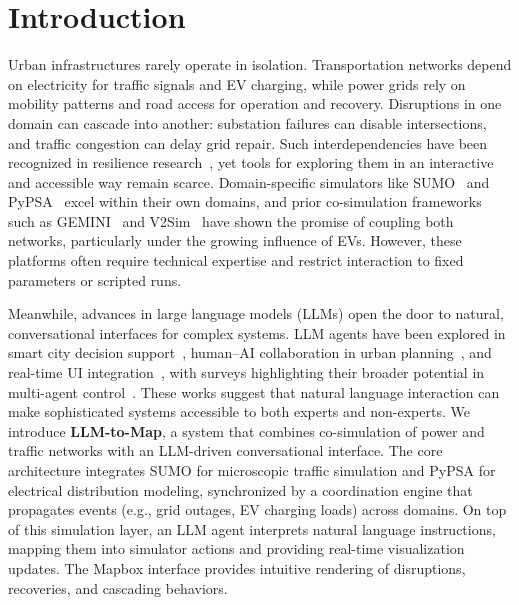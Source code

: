 \documentclass[sigconf,review,nonacm]{acmart}
\begin{document}
\maketitle

\section{Introduction}
Urban infrastructures rarely operate in isolation. Transportation networks depend on electricity for traffic signals and EV charging, while power grids rely on mobility patterns and road access for operation and recovery. Disruptions in one domain can cascade into another: substation failures can disable intersections, and traffic congestion can delay grid repair. Such interdependencies have been recognized in resilience research~\cite{rinaldi2001identifying, ouyang2014review, buldyrev2010catastrophic}, yet tools for exploring them in an interactive and accessible way remain scarce.
Domain-specific simulators like SUMO~\cite{lopez2018sumo} and PyPSA~\cite{brown2018pypsa} excel within their own domains, and prior co-simulation frameworks such as GEMINI~\cite{panossian2023architecture} and V2Sim~\cite{qian2024v2sim} have shown the promise of coupling both networks, particularly under the growing influence of EVs. However, these platforms often require technical expertise and restrict interaction to fixed parameters or scripted runs.

Meanwhile, advances in large language models (LLMs) open the door to natural, conversational interfaces for complex systems. LLM agents have been explored in smart city decision support~\cite{kalyuzhnaya2025llm}, human–AI collaboration in urban planning~\cite{han2025large}, and real-time UI integration~\cite{pozdniakov2024large}, with surveys highlighting their broader potential in multi-agent control~\cite{guo2024large}. These works suggest that natural language interaction can make sophisticated systems accessible to both experts and non-experts.
We introduce \textbf{LLM-to-Map}, a system that combines co-simulation of power and traffic networks with an LLM-driven conversational interface. The core architecture integrates SUMO for microscopic traffic simulation and PyPSA for electrical distribution modeling, synchronized by a coordination engine that propagates events (e.g., grid outages, EV charging loads) across domains. On top of this simulation layer, an LLM agent interprets natural language instructions, mapping them into simulator actions and providing real-time visualization updates. The Mapbox interface provides intuitive rendering of disruptions, recoveries, and cascading behaviors.
\end{document}
